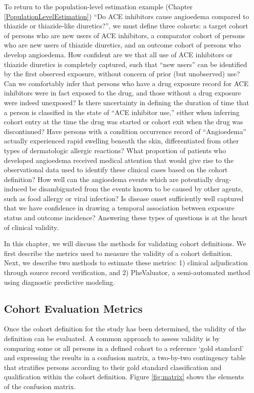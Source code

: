 \documentclass[11pt]{book}
\theoremstyle{definition}
\theoremstyle{definition}
\theoremstyle{definition}
\theoremstyle{remark}
\begin{document}
To return to the population-level estimation example (Chapter
\ref{PopulationLevelEstimation}) ``Do ACE inhibitors cause angioedema
compared to thiazide or thiazide-like diuretics?'', we must define three
cohorts: a target cohort of persons who are new users of ACE inhibitors,
a comparator cohort of persons who are new users of thiazide diuretics,
and an outcome cohort of persons who develop angioedema. How confident
are we that all use of ACE inhibitors or thiazide diuretics is
completely captured, such that ``new users'' can be identified by the
first observed exposure, without concern of prior (but unobserved) use?
Can we comfortably infer that persons who have a drug exposure record
for ACE inhibitors were in fact exposed to the drug, and those without a
drug exposure were indeed unexposed? Is there uncertainty in defining
the duration of time that a person is classified in the state of ``ACE
inhibitor use,'' either when inferring cohort entry at the time the drug
was started or cohort exit when the drug was discontinued? Have persons
with a condition occurrence record of ``Angioedema'' actually
experienced rapid swelling beneath the skin, differentiated from other
types of dermatologic allergic reactions? What proportion of patients
who developed angioedema received medical attention that would give rise
to the observational data used to identify these clinical cases based on
the cohort definition? How well can the angioedema events which are
potentially drug-induced be disambiguated from the events known to be
caused by other agents, such as food allergy or viral infection? Is
disease onset sufficiently well captured that we have confidence in
drawing a temporal association between exposure status and outcome
incidence? Answering these types of questions is at the heart of
clinical validity.

In this chapter, we will discuss the methods for validating cohort
definitions. We first describe the metrics used to measure the validity
of a cohort definition. Next, we describe two methods to estimate these
metrics: 1) clinical adjudication through source record verification,
and 2) PheValuator, a semi-automated method using diagnostic predictive
modeling.

\subsection{Cohort Evaluation Metrics}\label{cohort-evaluation-metrics}

Once the cohort definition for the study has been determined, the
validity of the definition can be evaluated. A common approach to assess
validity is by comparing some or all persons in a defined cohort to a
reference `gold standard' and expressing the results in a confusion
matrix, a two-by-two contingency table that stratifies persons according
to their gold standard classification and qualification within the
cohort definition. Figure \ref{fig:matrix} shows the elements of the
confusion matrix.
\end{document}
